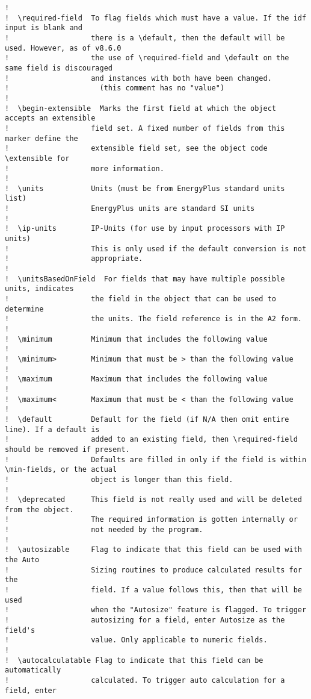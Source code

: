 \begin{lstlisting}
!
!  \required-field  To flag fields which must have a value. If the idf input is blank and
!                   there is a \default, then the default will be used. However, as of v8.6.0
!                   the use of \required-field and \default on the same field is discouraged
!                   and instances with both have been changed.
!                     (this comment has no "value")
!
!  \begin-extensible  Marks the first field at which the object accepts an extensible
!                   field set. A fixed number of fields from this marker define the
!                   extensible field set, see the object code \extensible for
!                   more information.
!
!  \units           Units (must be from EnergyPlus standard units list)
!                   EnergyPlus units are standard SI units
!
!  \ip-units        IP-Units (for use by input processors with IP units)
!                   This is only used if the default conversion is not
!                   appropriate.
!
!  \unitsBasedOnField  For fields that may have multiple possible units, indicates
!                   the field in the object that can be used to determine
!                   the units. The field reference is in the A2 form.
!
!  \minimum         Minimum that includes the following value
!
!  \minimum>        Minimum that must be > than the following value
!
!  \maximum         Maximum that includes the following value
!
!  \maximum<        Maximum that must be < than the following value
!
!  \default         Default for the field (if N/A then omit entire line). If a default is
!                   added to an existing field, then \required-field should be removed if present.
!                   Defaults are filled in only if the field is within \min-fields, or the actual
!                   object is longer than this field.
!
!  \deprecated      This field is not really used and will be deleted from the object.
!                   The required information is gotten internally or
!                   not needed by the program.
!
!  \autosizable     Flag to indicate that this field can be used with the Auto
!                   Sizing routines to produce calculated results for the
!                   field. If a value follows this, then that will be used
!                   when the "Autosize" feature is flagged. To trigger
!                   autosizing for a field, enter Autosize as the field's
!                   value. Only applicable to numeric fields.
!
!  \autocalculatable Flag to indicate that this field can be automatically
!                   calculated. To trigger auto calculation for a field, enter

\end{lstlisting}
